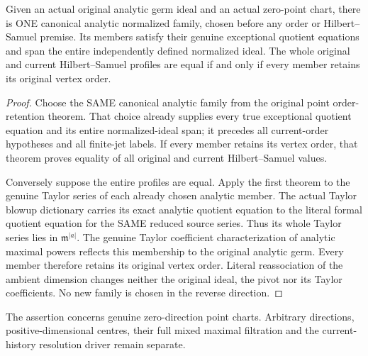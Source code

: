 \begin{theorem}
\label{hir:actual-original-zero-point-entire-hs-iff-canonical-orders}
\leanok
Given an actual original analytic germ ideal and an actual zero-point
chart, there is ONE canonical analytic normalized family, chosen before
any order or Hilbert--Samuel premise. Its members satisfy their genuine
exceptional quotient equations and span the entire independently defined
normalized ideal. The whole original and current Hilbert--Samuel profiles
are equal if and only if every member retains its original vertex order.
\end{theorem}
\begin{proof}
Choose the SAME canonical analytic family from the original point
order-retention theorem. That choice already supplies every true
exceptional quotient equation and its entire normalized-ideal span;
it precedes all current-order hypotheses and all finite-jet labels.
If every member retains its vertex order, that theorem proves equality
of all original and current Hilbert--Samuel values.

Conversely suppose the entire profiles are equal. Apply the first theorem
to the genuine Taylor series of each already chosen analytic member.
The actual Taylor blowup dictionary carries its exact analytic quotient
equation to the literal formal quotient equation for the SAME reduced
source series. Thus its whole Taylor series lies in
$\mathfrak m^{|a|}$. The genuine Taylor coefficient characterization
of analytic maximal powers reflects this membership to the original
analytic germ. Every member therefore retains its original vertex order.
Literal reassociation of the ambient dimension changes neither the
original ideal, the pivot nor its Taylor coefficients. No new family is
chosen in the reverse direction.
\end{proof}

The assertion concerns genuine zero-direction point charts. Arbitrary
directions, positive-dimensional centres, their full mixed maximal
filtration and the current-history resolution driver remain separate.
